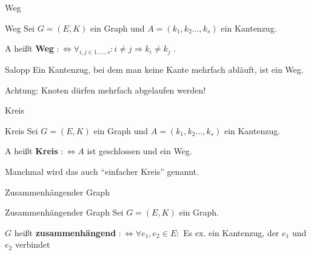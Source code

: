 \begin{frame}{Weg}
\begin{block}{Weg}
Sei $G = (E, K)$ ein Graph und $A = (k_1, k_2 \dots, k_s)$ ein Kantenzug.

A heißt \textbf{Weg} $:\Leftrightarrow \forall_{i, j \in 1, \dots, s}: i \neq j \Rightarrow k_i \neq k_j$ .
\end{block}

\pause

\begin{exampleblock}{Salopp}
Ein Kantenzug, bei dem man keine Kante mehrfach abläuft, ist ein Weg.
\end{exampleblock}

\pause

Achtung: Knoten dürfen mehrfach abgelaufen werden!
\end{frame}

\begin{frame}{Kreis}
\begin{block}{Kreis}
Sei $G = (E, K)$ ein Graph und $A = (k_1, k_2 \dots, k_s)$ ein Kantenzug.

A heißt \textbf{Kreis} $:\Leftrightarrow A$ ist geschlossen und ein Weg.
\end{block}

\pause

Manchmal wird das auch "`einfacher Kreis"' genannt.

\pause

\begin{gallery}
\end{gallery}
\end{frame}

\begin{frame}{Zusammenhängender Graph}
\begin{block}{Zusammenhängender Graph}
Sei $G = (E, K)$ ein Graph.

$G$ heißt \textbf{zusammenhängend} $:\Leftrightarrow \forall e_1, e_2 \in E: $ Es ex. ein Kantenzug, der $e_1$ und $e_2$ verbindet
\end{block}

\begin{gallery}
    \\
\end{gallery}
\end{frame}

